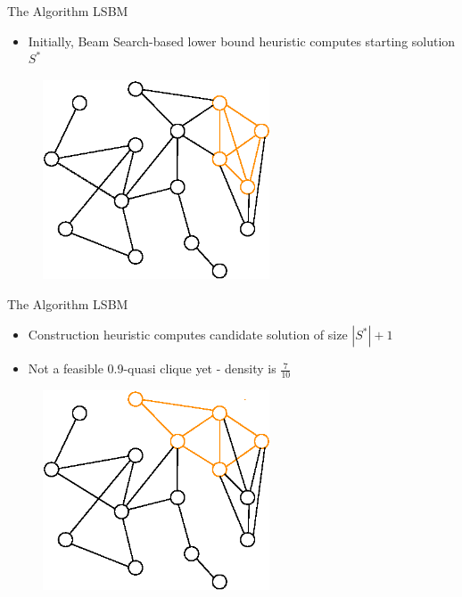 \documentclass{beamer}
\begin{document}
\begin{frame}{The Algorithm LSBM}
    \begin{itemize}
        \item Initially, Beam Search-based lower bound heuristic computes starting solution $S^*$ \\
    \end{itemize}
    \begin{figure}
        \centering
        \includegraphics[width=0.6\textwidth]{graphics/algorithm_poster_1.eps}
    \end{figure}
\end{frame}

\begin{frame}{The Algorithm LSBM}
    \begin{itemize}
        \item Construction heuristic computes candidate solution of size $|S^*|+1$
        \item Not a feasible 0.9-quasi clique yet - density is $\frac{7}{10}$
    \end{itemize}
    \begin{figure}
        \centering
        \includegraphics[width=0.6\textwidth]{graphics/algorithm_poster_2.eps}
    \end{figure}
\end{frame}
\end{document}
